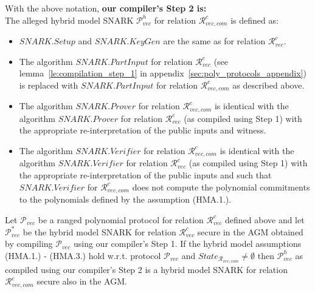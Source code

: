 \noindent With the above notation, \textbf{our compiler's Step 2 is:} \\
\noindent The alleged hybrid model SNARK $\mathscr{P}_{\mathit{vec}}^{h}$ for relation $\mathcal{R}_{\mathit{vec}, \mathit{com}}^c$ is defined as:
\begin{itemize}
\item $\mathit{SNARK.Setup}$ and $\mathit{SNARK.KeyGen}$ are the same as for relation $\mathcal{R}^{c}_{\mathit{vec}}$.
\item The algorithm $\mathit{SNARK.PartInput}$ for relation $\mathcal{R}^{c}_{\mathit{vec}}$ 
(see lemma~\ref{le:compilation_step_1} in appendix~\ref{sec:poly_protocols_appendix}) 
is replaced with $\mathit{SNARK.PartInput}$ for relation $\mathcal{R}_{\mathit{vec}, \mathit{com}}^c$ as described above.
\item The algorithm $\mathit{SNARK.Prover}$ for relation $\mathcal{R}_{\mathit{vec}, \mathit{com}}^c$ is identical with the algorithm 
$\mathit{SNARK.Prover}$ for relation $\mathcal{R}^{c}_{\mathit{vec}}$ (as compiled using Step 1) with the appropriate 
re-interpretation of the public inputs and witness.
\item The algorithm $\mathit{SNARK.Verifier}$ for relation $\mathcal{R}_{\mathit{vec}, \mathit{com}}^c$ is identical with the algorithm 
$\mathit{SNARK.Verifier}$ for relation $\mathcal{R}^{c}_{\mathit{vec}}$ (as compiled using Step 1) with the appropriate 
re-interpretation of the public inputs and such that $\mathit{SNARK.Verifier}$ for $\mathcal{R}_{\mathit{vec}, \mathit{com}}^c$ does
not compute the polynomial commitments to the polynomials defined by the assumption (HMA.1.).
\end{itemize}
\noindent \begin{lemma} 
\label{sergey_type_relations} 
Let $\mathscr{P}_{\mathit{vec}}$ be a ranged polynomial protocol for relation $\mathcal{R}^c_{\mathit{vec}}$ defined above and let 
$\mathscr{P}_{\mathit{vec}}^{*}$ be the hybrid model SNARK for relation $\mathcal{R}^c_{\mathit{vec}}$ secure in the AGM obtained 
by compiling $\mathscr{P}_{\mathit{vec}}$ using our compiler's Step 1. If the hybrid model assumptions (HMA.1.) - (HMA.3.) hold w.r.t. 
protocol $\mathscr{P}_{\mathit{vec}}$ and $\mathit{State}_{\mathcal{R}_{\mathit{vec}, \mathit{com}}} \neq \emptyset $ then 
$\mathscr{P}_{\mathit{vec}}^{h}$ as compiled using our compiler's Step 2 is a hybrid model SNARK for relation 
$\mathcal{R}_{\mathit{vec}, \mathit{com}}^c$ secure also in the AGM.
\end{lemma}

